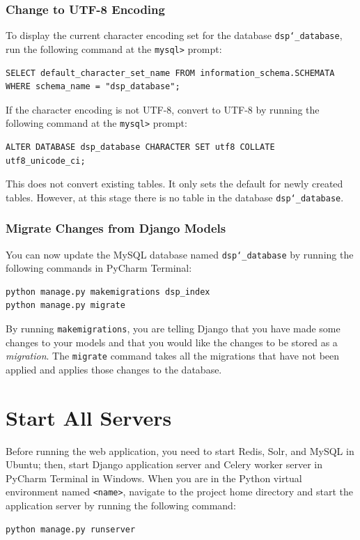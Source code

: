 \subsubsection{Change to UTF-8 Encoding}
To display the current character encoding set for the database \texttt{dsp\char`_database}, run the following command at the \texttt{mysql>} prompt:
\begin{verbatim}
SELECT default_character_set_name FROM information_schema.SCHEMATA 
WHERE schema_name = "dsp_database";
\end{verbatim}

If the character encoding is not UTF-8, convert to UTF-8 by running the following command at the \texttt{mysql>} prompt:
\begin{verbatim}
ALTER DATABASE dsp_database CHARACTER SET utf8 COLLATE utf8_unicode_ci;
\end{verbatim}

This does not convert existing tables. It only sets the default for newly created tables. However, at this stage there is no table in the database \texttt{dsp\char`_database}.

\subsubsection{Migrate Changes from Django Models}
You can now update the MySQL database named \texttt{dsp\char`_database} by running the following commands in PyCharm Terminal:
\begin{verbatim}
python manage.py makemigrations dsp_index
python manage.py migrate
\end{verbatim}

By running \texttt{makemigrations}, you are telling Django that you have made some changes to your models and that you would like the changes to be stored as a \textit{migration}. The \texttt{migrate} command takes all the migrations that have not been applied and applies those changes to the database.

\section{Start All Servers}
Before running the web application, you need to start Redis, Solr, and MySQL in Ubuntu; then, start Django application server and Celery worker server in PyCharm Terminal in Windows. When you are in the Python virtual environment named \texttt{<name>}, navigate to the project home directory  and start the application server by running the following command:
\begin{verbatim}
python manage.py runserver
\end{verbatim}

